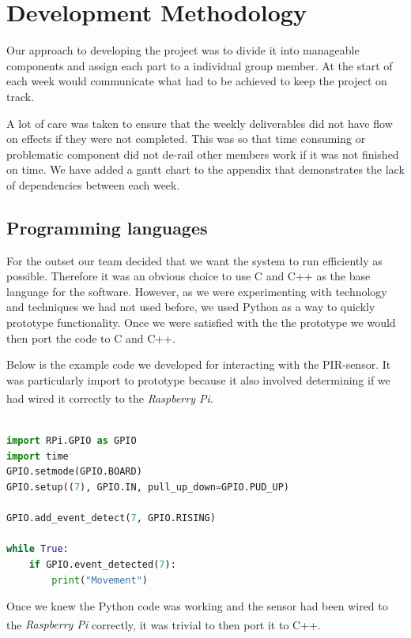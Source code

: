 \documentclass[11pt,a4paper,titlepage]{report}
\newcommand{\rpi}{\textit{Raspberry Pi\textsuperscript{\textregistered}}}
\begin{document}
\section{Development Methodology}

Our approach to developing the project was to divide it into manageable components and assign each part to a individual group member. At the start of each week would communicate what had to be achieved to keep the project on track. 

A lot of care was taken to ensure that the weekly deliverables did not have flow on effects if they were not completed. This was so that time consuming or problematic component did not de-rail other members work if it was not finished on time. We have added a gantt chart to the appendix that demonstrates the lack of dependencies between each week.

\subsection{Programming languages}

For the outset our team decided that we want the system to run efficiently as possible. Therefore it was an obvious choice to use C and C++ as the base language for the software. However, as we were experimenting with technology and techniques we had not used before, we used Python as a way to quickly prototype functionality. Once we were satisfied with the the prototype we would then port the code to C and C++.

Below is the example code we developed for interacting with the PIR-sensor. It was particularly import to prototype because it also involved determining if we had wired it correctly to the \rpi.

\begin{lstlisting}[caption={Python code for interacting with the PIR-sensor},label=pir-sensor-test.py,language=python]

import RPi.GPIO as GPIO
import time
GPIO.setmode(GPIO.BOARD)
GPIO.setup((7), GPIO.IN, pull_up_down=GPIO.PUD_UP)

GPIO.add_event_detect(7, GPIO.RISING)

while True:
    if GPIO.event_detected(7):
        print("Movement")
\end{lstlisting}

Once we knew the Python code was working and the sensor had been wired to the \rpi\xspace correctly, it was trivial to then port it to C++.
\end{document}
